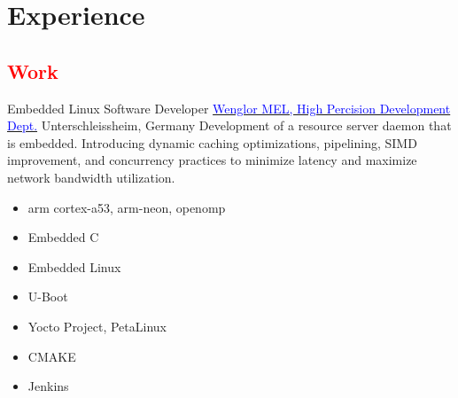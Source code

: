 \section{Experience}

\vspace{2mm}
\subsection{\Large{\textcolor{red}{Work}}}
        { Embedded Linux Software Developer}
        {\href{https://www.wenglor.com/en/}{\textcolor{blue}{Wenglor MEL, High Percision Development Dept.}}}
        {Unterschleissheim, Germany}
        {
        \newline
        Development of a resource server daemon that is embedded.  Introducing dynamic caching optimizations, pipelining, SIMD improvement, and concurrency practices to minimize latency and maximize network bandwidth utilization.        
        }
        {
        \begin{itemize}
            \item arm cortex-a53, arm-neon, openomp
            \item Embedded C
            \item Embedded Linux
            \item U-Boot
            \item Yocto Project, PetaLinux
            \item CMAKE
            \item Jenkins
        \end{itemize}
        }
        

